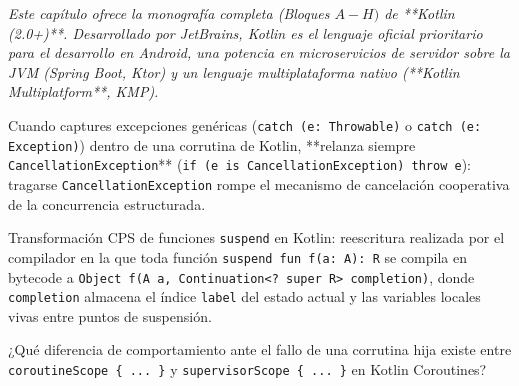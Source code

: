 \documentclass{book}
\begin{document}
\noindent\textit{Este capítulo ofrece la monografía completa (Bloques \(A-H)\) de **Kotlin (2.0+)**. Desarrollado por JetBrains, Kotlin es el lenguaje oficial prioritario para el desarrollo en Android, una potencia en microservicios de servidor sobre la JVM (Spring Boot, Ktor) y un lenguaje multiplataforma nativo (**Kotlin Multiplatform**, KMP).}

\begin{tcolorbox}[title={Consejo}, studiumtip, breakable]

Cuando captures excepciones genéricas (\texttt{catch (e: Throwable)} o \texttt{catch (e: Exception)}) dentro de una corrutina de Kotlin, **relanza siempre \texttt{CancellationException}** (\texttt{if (e is CancellationException) throw e}): tragarse \texttt{CancellationException} rompe el mecanismo de cancelación cooperativa de la concurrencia estructurada.
\end{tcolorbox}

\begin{tcolorbox}[title={Definición}, studiumdef, breakable]

Transformación CPS de funciones \texttt{suspend} en Kotlin: reescritura realizada por el compilador en la que toda función \texttt{suspend fun f(a: A): R} se compila en bytecode a \texttt{Object f(A a, Continuation<? super R> completion)}, donde \texttt{completion} almacena el índice \texttt{label} del estado actual y las variables locales vivas entre puntos de suspensión.
\end{tcolorbox}

\begin{tcolorbox}[title={Autoficha}, studiumcheck, breakable]

¿Qué diferencia de comportamiento ante el fallo de una corrutina hija existe entre \texttt{coroutineScope \{ ... \}} y \texttt{supervisorScope \{ ... \}} en Kotlin Coroutines?
\end{tcolorbox}
\end{document}
